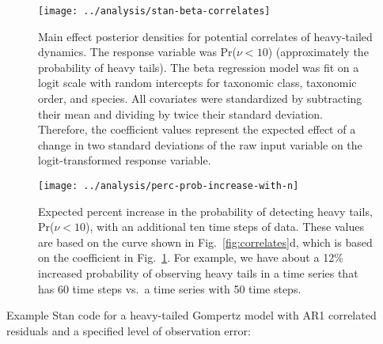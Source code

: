 \clearpage


\begin{figure}[htbp]
\begin{center}
\texttt{[image: ../analysis/stan-beta-correlates]}
\caption{
  Main effect posterior densities for potential correlates of heavy-tailed
  dynamics. The response variable was Pr($\nu < 10$) (approximately the
  probability of heavy tails). The beta regression model was fit on a logit
  scale with random intercepts for taxonomic class, taxonomic order, and
  species. All covariates were standardized by subtracting their mean and
  dividing by twice their standard deviation. Therefore, the coefficient values
  represent the expected effect of a change in two standard deviations of the
  raw input variable on the logit-transformed response variable.
}
    \label{fig:correlate-coefs}
\end{center}
\end{figure}

\begin{figure}[htbp]
\begin{center}
\texttt{[image: ../analysis/perc-prob-increase-with-n]}
\caption{
Expected percent increase in the probability of detecting heavy tails, Pr($\nu
< 10$), with an additional ten time steps of data. These values are based on
the curve shown in Fig.~\ref{fig:correlates}d, which is based on the
coefficient in Fig.~\ref{fig:correlate-coefs}. For example, we have about
a 12\% increased probability of observing heavy tails in a time series that has
60 time steps vs.\ a time series with 50 time steps.
}
\label{fig:perc-inc-p}
\end{center}
\end{figure}

\clearpage

\noindent
Example Stan code for a heavy-tailed Gompertz model with AR1 correlated
residuals and a specified level of observation error:

